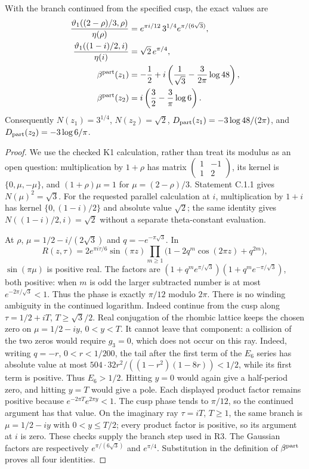 \begin{statement}
With the branch continued from the specified cusp, the exact values are
\begin{align*}
 \frac{\vartheta _1((2-\rho)/3,\rho)}{\eta(\rho)}
   &=e^{\pi i/12}\,3^{1/4}e^{\pi/(6\sqrt3)},\\
 \frac{\vartheta _1((1-i)/2,i)}{\eta(i)}
   &=\sqrt2\,e^{\pi/4},\\
 \beta^{\rm part}(z_1)
   &=-\frac12+i\left(\frac1{\sqrt3}-\frac3{2\pi}\log48\right),\\
 \beta^{\rm part}(z_2)
   &=i\left(\frac32-\frac3\pi\log6\right).
\end{align*}
Consequently $N(z_1)=3^{1/4}$, $N(z_2)=\sqrt2$,
$D_{\rm part}(z_1)=-3\log48/(2\pi)$, and
$D_{\rm part}(z_2)=-3\log6/\pi$.
\end{statement}
\begin{proof}
We use the checked K1 calculation, rather than treat its modulus as an
open question: multiplication by $1+\rho$ has matrix
$\left(\begin{smallmatrix}1&-1\\1&2\end{smallmatrix}\right)$,
its kernel is $\{0,\mu,-\mu\}$, and $(1+\rho)\mu=1$ for
$\mu=(2-\rho)/3$. Statement C.1.1 gives $N(\mu)^2=\sqrt3$.
For the requested parallel calculation at $i$, multiplication by $1+i$
has kernel $\{0,(1-i)/2\}$ and absolute value $\sqrt2$; the same
identity gives $N((1-i)/2,i)=\sqrt2$ without a separate theta-constant
evaluation.

At $\rho$, $\mu=1/2-i/(2\sqrt3)$ and $q=-e^{-\pi\sqrt3}$. In
\[
 R(z,\tau)=2e^{\pi i\tau/6}\sin(\pi z)
 \prod_{m\ge1}\bigl(1-2q^m\cos(2\pi z)+q^{2m}\bigr),
\]
$\sin(\pi\mu)$ is positive real. The factors are
$(1+q^m e^{\pi/\sqrt3})(1+q^m e^{-\pi/\sqrt3})$, both positive:
when $m$ is odd the larger subtracted number is at most
$e^{-2\pi/\sqrt3}<1$. Thus the phase is exactly $\pi/12$ modulo
$2\pi$. There is no winding ambiguity in the continued logarithm.
Indeed continue from the cusp along $\tau=1/2+iT$,
$T\ge\sqrt3/2$. Real conjugation of the rhombic lattice keeps the
chosen zero on $\mu=1/2-iy$, $0<y<T$. It cannot leave that component:
a collision of the two zeros would require $g_3=0$, which does not
occur on this ray. Indeed, writing $q=-r$, $0<r<1/200$,
the tail after the first term of the $E_6$ series has absolute value
at most $504\cdot32r^2/((1-r^2)(1-8r))<1/2$, while its
first term is positive. Thus $E_6>1/2$. Hitting $y=0$ would again give a half-period zero, and
hitting $y=T$ would give a pole. Each displayed product factor remains
positive because $e^{-2\pi T}e^{2\pi y}<1$. The cusp phase tends to
$\pi/12$, so the continued argument has that value. On the imaginary
ray $\tau=iT$, $T\ge1$, the same branch is
$\mu=1/2-iy$ with $0<y\le T/2$; every product factor is positive,
so its argument at $i$ is zero. These checks supply the branch step
used in R3. The Gaussian factors are respectively
$e^{\pi/(6\sqrt3)}$ and $e^{\pi/4}$. Substitution in the definition of
$\beta^{\rm part}$ proves all four identities.
\end{proof}

